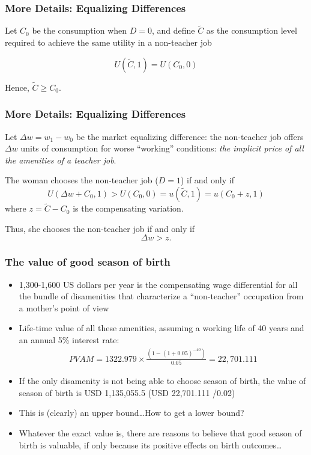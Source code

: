 \documentclass[10pt,letterpaper,subeqn]{beamer}
\begin{document}
\begin{frame}
  \frametitle{More Details: Equalizing Differences}
  Let $C_0$ be the consumption when $D=0$, and define $\widetilde{C}$ as the consumption level required to achieve the same utility in a non-teacher job

  \[
    U(\widetilde{C},1) = U(C_0,0)
  \]

  Hence, $\widetilde{C} \geq C_0$.
\end{frame}

\begin{frame}
  \frametitle{More Details: Equalizing Differences}
  Let $\Delta w = w_1 - w_0$ be the market equalizing difference: the non-teacher job offers $\Delta w$ units of consumption for worse ``working'' conditions: \emph{the implicit price of all the amenities of a teacher job}. \vspace{4mm}

  The woman chooses the non-teacher job ($D=1$) if and only if
  \[
    U(\Delta w + C_0,1)>U(C_0,0)=u(\widetilde{C},1)=u(C_0 + z, 1)
  \]
  where $z = \widetilde{C} - C_0$ is the compensating variation.

  \vspace{4mm}
  Thus, she chooses the non-teacher job if and only if
  \[
    \Delta w > z.
    \]
    
\hyperlink{equalizingDiff}{}
\end{frame}

\begin{frame}
\frametitle{The value of good season of birth}
\begin{itemize}
\item 1,300-1,600 US dollars per year is the compensating wage differential for all the bundle of disamenities that characterize a ``non-teacher'' occupation from a mother's point of view
\item Life-time value of all these amenities, assuming a working life of 40 years and an annual 5\% interest rate:
\begin{align}
PVAM = 1322.979 \times \frac{(1-(1+0.05)^{-40})}{0.05} = 22,701.111
\end{align}
\item If the only disamenity is not being able to choose season of birth, the value of season of birth is USD 1,135,055.5 (USD 22,701.111 /0.02)
\item This is (clearly) an upper bound\ldots How to get a lower bound?
\item Whatever the exact value is, there are reasons to believe that good season of birth is valuable, if only because its positive effects on birth outcomes\ldots
\end{itemize}
\end{frame}
\end{document}
